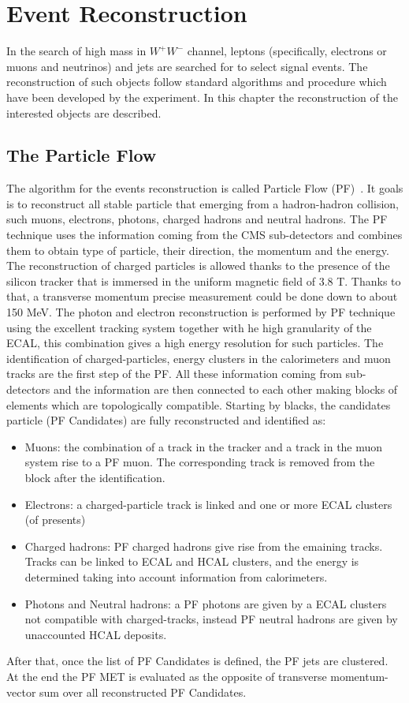 \chapter{Event Reconstruction}
In the search of high mass in $W^+W^-$ channel, leptons (specifically, electrons or muons and neutrinos) and jets are searched for to select signal events.
The reconstruction of such objects follow standard algorithms and procedure which have been
developed by the experiment. In this chapter the reconstruction of the interested objects are described.

\section{The Particle Flow}
\label{PFt}
The algorithm for the events reconstruction is called Particle Flow (PF)~\cite{CMS-PAS-PFT-09-001}. It goals is to reconstruct all stable particle that emerging from a hadron-hadron collision, such muons, electrons, photons, charged hadrons and neutral hadrons. The PF technique uses the information coming from the 
CMS sub-detectors and combines them to obtain type of particle, their direction, the momentum and the energy.
The reconstruction of charged particles is allowed thanks to the presence of the silicon tracker that is immersed in the uniform magnetic field of 3.8 T. 
Thanks to that, a transverse momentum precise measurement could be done down to about 150 MeV.
The photon and electron reconstruction is performed by PF technique using the excellent tracking system together with he high granularity of the ECAL, this combination gives a high energy resolution for such particles.
The identification of charged-particles, energy clusters in the  calorimeters and muon tracks are the first step of the PF. All these information coming from sub-detectors and the information are then connected to each other making blocks of elements which are topologically compatible.
Starting by blacks, the candidates particle (PF Candidates) are fully reconstructed and identified as:
\begin{itemize}
\item Muons: the combination of a track in the tracker and a track in the muon system rise to a PF muon. The corresponding track is removed from the block after the identification.
\item Electrons: a charged-particle track is linked and one or more ECAL clusters (of presents)
\item Charged hadrons: PF charged hadrons give rise from the emaining tracks. Tracks can
be linked to ECAL and HCAL clusters, and the energy is determined taking into
account information from calorimeters.
\item Photons and Neutral hadrons:  a PF photons are given by a ECAL clusters not compatible with charged-tracks, instead PF
neutral hadrons are given by unaccounted HCAL deposits.
\end{itemize}
After that, once the list of PF Candidates is defined, the PF jets are clustered. At the end the PF MET is evaluated as the  opposite of transverse momentum-vector sum over all reconstructed PF Candidates.

